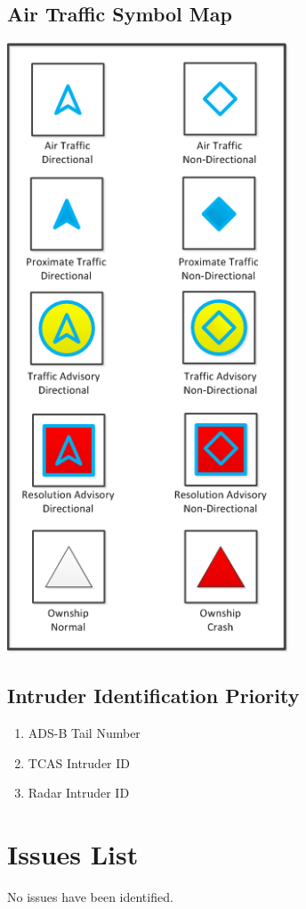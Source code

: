 \documentclass[12pt,oneside,letterpaper]{article}
\begin{document}
\subsection{Air Traffic Symbol Map}
\includegraphics[scale=0.40]{TrafficIcons.png} \\

\subsection{Intruder Identification Priority}
\begin{enumerate}
\item ADS-B Tail Number
\item TCAS Intruder ID
\item Radar Intruder ID
\end{enumerate}

\section{Issues List}
No issues have been identified.
\end{document}
